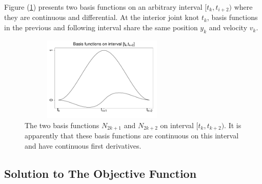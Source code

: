 Figure (\ref{basisfigure}) presents two basis functions on an arbitrary interval $[t_k, t_{i+2} )$ where they are continuous and differential. At the interior joint knot $t_k$, basis functions in the previous and following interval share the same position $y_k$ and velocity $v_k$. 
\begin{figure}[h] \centering
\includegraphics[width=8cm, height=4cm]{Chapters/2.TractorSplineTheory/plot/basistk}
\caption{The two basis functions $N_{2k+1}$ and $N_{2k+2}$ on interval $[t_k, t_{k+2})$. It is apparently that these basis functions are continuous on this interval and have continuous first derivatives.}
\label{basisfigure}
\end{figure}





\subsection{Solution to The Objective Function}

